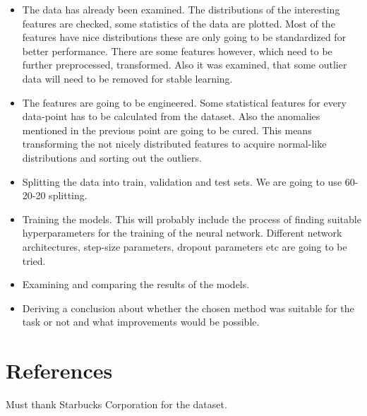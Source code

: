 \documentclass[10pt,oneside,a4paper]{report}
\begin{document}
\begin{itemize}
	\item The data has already been examined. The distributions of the interesting features are checked, some statistics of the data are plotted. Most of the features have nice distributions these are only going to be standardized for better performance. There are some features however, which need to be further preprocessed, transformed. Also it was examined, that some outlier data will need to be removed for stable learning. 
	\item The features are going to be engineered. Some statistical features for every data-point has to be calculated from the dataset. Also the anomalies mentioned in the previous point are going to be cured. This means transforming the not nicely distributed features to acquire normal-like distributions and sorting out the outliers.
	\item Splitting the data into train, validation and test sets. We are going to use 60-20-20 splitting.
	\item Training the models. This will probably include the process of finding suitable hyperparameters for the training of the neural network. Different network architectures, step-size parameters, dropout parameters etc are going to be tried.
	\item Examining and comparing the results of the models. 
	\item Deriving a conclusion about whether the chosen method was suitable for the task or not and what improvements would be possible.
\end{itemize}

\section*{References}
Must thank Starbucks Corporation for the dataset. 


 
\end{document}
